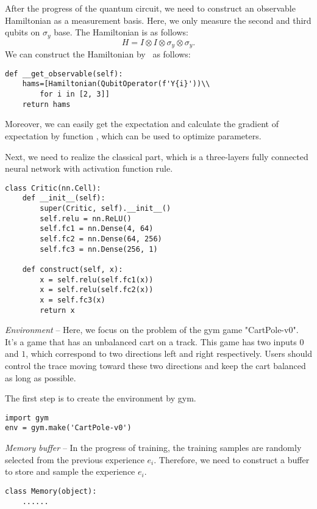 After the progress of the quantum circuit, we need to construct an observable Hamiltonian as a measurement basis. Here, we only measure the second and third qubits on $\sigma_y$ base. The Hamiltonian is as follows:
\begin{equation}
    H=I\otimes I\otimes\sigma_y\otimes\sigma_y.
\end{equation}
We can construct the Hamiltonian by \MindQuantum\ as follows:
\begin{lstlisting}
def __get_observable(self):
    hams=[Hamiltonian(QubitOperator(f'Y{i}'))\\
        for i in [2, 3]]
    return hams
\end{lstlisting}
Moreover, we can easily get the expectation and calculate the gradient of expectation by function \getexpectationwithgrad, which can be used to optimize parameters.

Next, we need to realize the classical part, which is a three-layers fully connected neural network with activation function rule.
\begin{lstlisting}
class Critic(nn.Cell):
    def __init__(self):
        super(Critic, self).__init__()
        self.relu = nn.ReLU()
        self.fc1 = nn.Dense(4, 64)
        self.fc2 = nn.Dense(64, 256)
        self.fc3 = nn.Dense(256, 1)

    def construct(self, x):
        x = self.relu(self.fc1(x))
        x = self.relu(self.fc2(x))
        x = self.fc3(x)
        return x
\end{lstlisting}

\textit{Environment} -- Here, we focus on the problem of the gym game "CartPole-v0". It's a game that has an unbalanced cart on a track. This game has two inputs $0$ and $1$, which correspond to two directions left and right respectively. Users should control the trace moving toward these two directions and keep the cart balanced as long as possible.

The first step is to create the environment by gym.
\begin{lstlisting}
import gym
env = gym.make('CartPole-v0')
\end{lstlisting}
\textit{Memory buffer} -- In the progress of training, the training samples are randomly selected from the previous experience $e_i$. Therefore, we need to construct a buffer to store and sample the experience $e_i$.
\begin{lstlisting}
class Memory(object):
    ......
\end{lstlisting}

